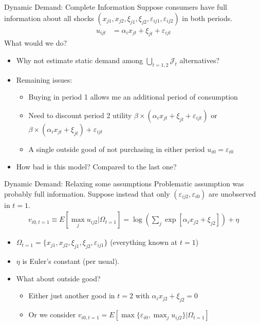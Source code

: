 \begin{frame}{Dynamic Demand: Complete Information}
Suppose consumers have full information about all shocks $(x_{j1},x_{j2},\xi_{j1},\xi_{j2},\varepsilon_{ij1},\varepsilon_{ij2})$ in both periods. 
\begin{align*}
u_{ijt} &=   \alpha_i x_{jt}  +  \xi_{jt} + \varepsilon_{ijt}
\end{align*}
What would we do?
\begin{itemize}
\item Why not estimate static demand among $\bigcup_{t=1,2}  \mathcal{J}_t $ alternatives?
\item Remaining issues:
\begin{itemize}
\item Buying in period 1 allows me an additional period of consumption
\item Need to discount period 2 utility $\beta \times ( \alpha_i x_{jt}  +  \xi_{jt} + \varepsilon_{ijt})$ or $\beta \times ( \alpha_i x_{jt}  +  \xi_{jt} )+\varepsilon_{ijt}$
\item A single outside good of not purchasing in either period $ u_{i0} =  \varepsilon_{i0} $
\end{itemize}
\item How bad is this model? Compared to the last one?
\end{itemize}
\end{frame}

\begin{frame}{Dynamic Demand: Relaxing some assumptions}
Problematic assumption was probably full information. Suppose instead that only $(\varepsilon_{ij2},\varepsilon_{i0})$ are \alert{unobserved} in $t=1$. 
\begin{align*}
v_{i0,t=1} \equiv E [\max_j u_{ij2}  | \Omega_{t=1}] = \log \left( \sum_j \exp [ \alpha_i x_{j2}  +  \xi_{j2} ] \right) + \eta
\end{align*}
\begin{itemize}
\item $\Omega_{t=1}= \{x_{j1},x_{j2},\xi_{j1},\xi_{j2},\varepsilon_{ij1}\}$ (everything known at $t=1$) 
\item $\eta$ is Euler's constant (per usual).
\item What about outside good?
\begin{itemize}
\item Either just another good in $t=2$ with $\alpha_i x_{j2}+ \xi_{j2} = 0$
\item Or we consider $v_{i0,t=1}=E [\max \{ \varepsilon_{i0}, \max_j u_{ij2} \}  | \Omega_{t=1}]$
\end{itemize}
\end{itemize}
\end{frame}

